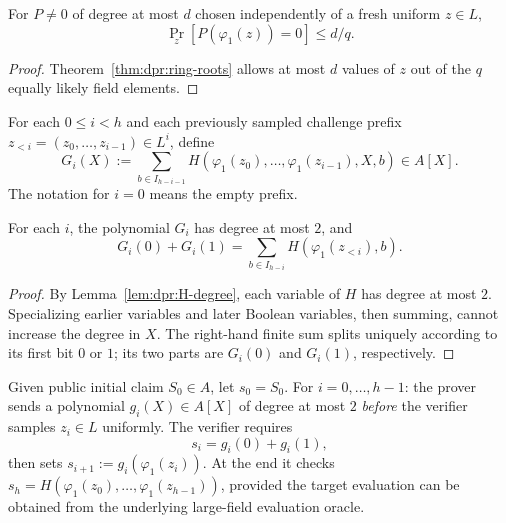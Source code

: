 \begin{corollary}\label{cor:dpr:ring-prob}
For $P\neq0$ of degree at most $d$
chosen independently of a fresh
uniform $z\in L$,
\[
 \Pr_z[P(\varphi_1(z))=0]\leq d/q.
\]
\end{corollary}
\begin{proof}
Theorem~\ref{thm:dpr:ring-roots}
allows at most $d$ values of $z$
out of the $q$ equally likely
field elements.
\end{proof}

\begin{definition}\label{def:dpr:true-partial}
For each $0\leq i<h$ and each
previously sampled challenge prefix
$z_{<i}=(z_0,\ldots,z_{i-1})\in L^i$,
define
\[
 G_i(X):=
 \sum_{b\in I_{h-i-1}}
 H(\varphi_1(z_0),\ldots,
   \varphi_1(z_{i-1}),X,b)
 \in A[X].
\]
The notation for $i=0$ means
the empty prefix.
\end{definition}

\begin{lemma}\label{lem:dpr:true-partial}
For each $i$, the polynomial $G_i$
has degree at most $2$, and
\[
 G_i(0)+G_i(1)
 =\sum_{b\in I_{h-i}}
 H(\varphi_1(z_{<i}),b).
\]
\end{lemma}
\begin{proof}
By Lemma~\ref{lem:dpr:H-degree},
each variable of $H$ has degree
at most $2$. Specializing earlier
variables and later Boolean variables,
then summing, cannot increase the
degree in $X$.
The right-hand finite sum splits
uniquely according to its first bit
$0$ or $1$; its two parts are
$G_i(0)$ and $G_i(1)$, respectively.
\end{proof}

\begin{definition}\label{def:dpr:sumcheck}
Given public initial claim $S_0\in A$,
let $s_0=S_0$. For $i=0,\ldots,h-1$:
the prover sends a polynomial
$g_i(X)\in A[X]$ of degree at most $2$
\emph{before} the verifier samples
$z_i\in L$ uniformly. The verifier
requires
\[
 s_i=g_i(0)+g_i(1),
\]
then sets
$s_{i+1}:=g_i(\varphi_1(z_i))$.
At the end it checks
$s_h=H(\varphi_1(z_0),\ldots,
                  \varphi_1(z_{h-1}))$,
provided the target evaluation can
be obtained from the underlying
large-field evaluation oracle.
\end{definition}

